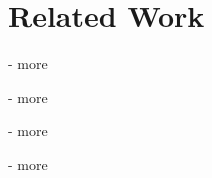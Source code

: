 \section{Related Work}
- more \cite{paper1}

- more \cite{paper2}

- more \cite{refinement1,refinement2,refinement3}

- more \cite{Foundation_ILP}